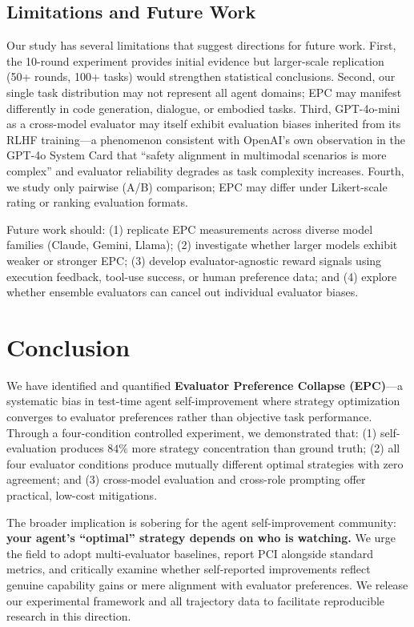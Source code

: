 \documentclass[11pt,a4paper]{article}
\begin{document}
\subsection{Limitations and Future Work}

Our study has several limitations that suggest directions for future work. First, the 10-round experiment provides initial evidence but larger-scale replication (50+ rounds, 100+ tasks) would strengthen statistical conclusions. Second, our single task distribution may not represent all agent domains; EPC may manifest differently in code generation, dialogue, or embodied tasks. Third, GPT-4o-mini as a cross-model evaluator may itself exhibit evaluation biases inherited from its RLHF training---a phenomenon consistent with OpenAI's own observation in the GPT-4o System Card \cite{openai2024gpt4o} that ``safety alignment in multimodal scenarios is more complex'' and evaluator reliability degrades as task complexity increases. Fourth, we study only pairwise (A/B) comparison; EPC may differ under Likert-scale rating or ranking evaluation formats.

Future work should: (1) replicate EPC measurements across diverse model families (Claude, Gemini, Llama); (2) investigate whether larger models exhibit weaker or stronger EPC; (3) develop evaluator-agnostic reward signals using execution feedback, tool-use success, or human preference data; and (4) explore whether ensemble evaluators can cancel out individual evaluator biases.

\section{Conclusion}

We have identified and quantified \textbf{Evaluator Preference Collapse (EPC)}---a systematic bias in test-time agent self-improvement where strategy optimization converges to evaluator preferences rather than objective task performance. Through a four-condition controlled experiment, we demonstrated that: (1) self-evaluation produces $84\%$ more strategy concentration than ground truth; (2) all four evaluator conditions produce mutually different optimal strategies with zero agreement; and (3) cross-model evaluation and cross-role prompting offer practical, low-cost mitigations.

The broader implication is sobering for the agent self-improvement community: \textbf{your agent's ``optimal'' strategy depends on who is watching.} We urge the field to adopt multi-evaluator baselines, report PCI alongside standard metrics, and critically examine whether self-reported improvements reflect genuine capability gains or mere alignment with evaluator preferences. We release our experimental framework and all trajectory data to facilitate reproducible research in this direction.
\end{document}
